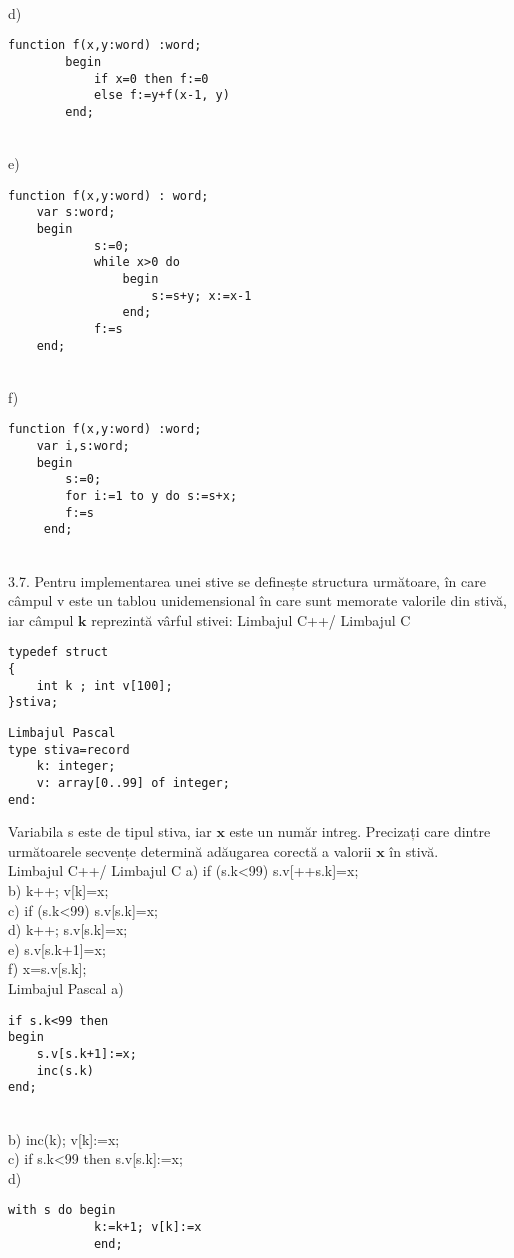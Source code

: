 \\
d) \begin{verbatim}
function f(x,y:word) :word;
        begin
            if x=0 then f:=0
            else f:=y+f(x-1, y)
        end;
\end{verbatim}
\\
e) \begin{verbatim}
function f(x,y:word) : word;
    var s:word;
    begin
            s:=0;
            while x>0 do
                begin
                    s:=s+y; x:=x-1
                end;
            f:=s
    end;
\end{verbatim}
\\
f) \begin{verbatim}
function f(x,y:word) :word;
    var i,s:word;
    begin
        s:=0;
        for i:=1 to y do s:=s+x;
        f:=s
     end;
\end{verbatim}
\\
3.7. Pentru implementarea unei stive se definește structura următoare, în care câmpul v este un tablou unidemensional în care sunt memorate valorile din stivă, iar câmpul $\mathbf{k}$ reprezintă vârful stivei:
Limbajul C++/ Limbajul C
\begin{verbatim}
typedef struct
{
    int k ; int v[100];
}stiva;
\end{verbatim}
\begin{verbatim}
Limbajul Pascal
type stiva=record
    k: integer;
    v: array[0..99] of integer;
end:
\end{verbatim}
Variabila s este de tipul stiva, iar $\mathbf{x}$ este un număr intreg.
Precizați care dintre următoarele secvențe determină adăugarea corectă a valorii $\mathbf{x}$ în stivă.
\\
Limbajul C++/ Limbajul C
a) if (s.k<99) s.v[++s.k]=x;
\\
b) k++; v[k]=x;
\\
c) if (s.k<99) s.v[s.k]=x;
\\
d) k++; s.v[s.k]=x;
\\
e) s.v[s.k+1]=x;
\\
f) x=s.v[s.k];
\\
Limbajul Pascal
a) \begin{verbatim}
if s.k<99 then
begin
    s.v[s.k+1]:=x;
    inc(s.k)
end;
\end{verbatim}
\\
b) inc(k); v[k]:=x;
\\
c) if s.k<99 then s.v[s.k]:=x;
\\
d) \begin{verbatim}
with s do begin 
            k:=k+1; v[k]:=x 
            end;
\end{verbatim}
